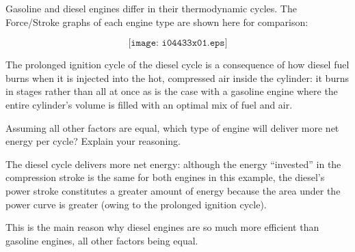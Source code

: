 

Gasoline and diesel engines differ in their thermodynamic cycles.  The Force/Stroke graphs of each engine type are shown here for comparison:

$$\texttt{[image: i04433x01.eps]}$$

The prolonged ignition cycle of the diesel cycle is a consequence of how diesel fuel burns when it is injected into the hot, compressed air inside the cylinder: it burns in stages rather than all at once as is the case with a gasoline engine where the entire cylinder's volume is filled with an optimal mix of fuel and air.

Assuming all other factors are equal, which type of engine will deliver more net energy per cycle?  Explain your reasoning.







The diesel cycle delivers more net energy: although the energy ``invested'' in the compression stroke is the same for both engines in this example, the diesel's power stroke constitutes a greater amount of energy because the area under the power curve is greater (owing to the prolonged ignition cycle).

\vskip 10pt

This is the main reason why diesel engines are so much more efficient than gasoline engines, all other factors being equal.











